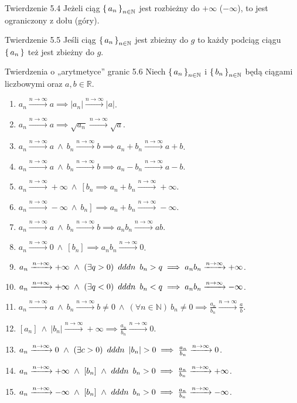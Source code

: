 \documentclass{article}
\newcommand{\hquad}{\mkern9mu}
\newcommand{\R}{\mathbb{R}}
\newcommand{\N}{\mathbb{N}}
\newcommand{\arn}{\xrightarrow{n\to\infty}}
\newcommand{\seq}[1]{\set{#1_n}_{n\in\N}}
\begin{document}
\begin{twier}{Twierdzenie 5.4}
    Jeżeli ciąg $\seq{a}$ jest rozbieżny do $+\infty$ ($-\infty$),
    to jest ograniczony z dołu (góry).
\end{twier}

\begin{twier}{Twierdzenie 5.5}
Jeśli ciąg $\seq{a}$ jest zbieżny do $g$ to każdy podciąg ciągu $\set{a_n}$ też
jest zbieżny do $g$.
\end{twier}

\begin{twier}{Twierdzenia o „arytmetyce” granic 5.6}
    Niech $\seq{a}$ i $\seq{b}$ będą ciągami liczbowymi oraz $a,b \in\R$.
    \begin{enumerate}[label=(\arabic*)]
        \item $a_n\arn a \implies |a_n|\arn|a|$.
        \item $a_n\arn a \implies \sqrt{a_n}\arn\sqrt{a}$.
        \item $a_n\arn a\ \land\  b_n\arn b \implies a_n+b_n\arn a+b$.
        \item $a_n\arn a\ \land\ b_n\arn b\implies a_n-b_n\arn a-b$.
        \item $a_n\arn+\infty\ \land\ \left[b_n\right. \implies a_n+b_n\arn +\infty$.
        \item $a_n\arn-\infty\ \land\ \left.b_n\right] \implies a_n+b_n\arn -\infty$.
        \item $a_n\arn a\ \land\ b_n\arn b\implies a_n b_n \arn ab$.
        \item $a_n\arn 0\ \land\ [b_n]\implies a_nb_n\arn 0$.
        \item $a_n\arn+\infty\ \land\ (\exists q>0)\hquad dddn\hquad b_n>q\implies a_nb_n\arn+\infty$.
        \item $a_n\arn+\infty\ \land\ (\exists q<0)\hquad dddn\hquad b_n<q\implies a_nb_n\arn-\infty$.
        \item $a_n\arn a\ \land\ b_n\arn b\neq0\ \land\ (\forall n\in\N)\ b_n\neq0\implies\frac{a_n}{b_n}\arn\frac{a}{b}$.
        \item $[a_n]\ \land\ |b_n|\arn+\infty\implies \frac{a_n}{b_n}\arn0$.
        \item $a_n\arn0\ \land\ (\exists c>0)\hquad dddn\hquad |b_n|>0 \implies \frac{a_n}{b_n}\arn0$.
        \item $a_n\arn+\infty\ \land\ [b_n]\ \land\ dddn\hquad b_n>0\implies \frac{a_n}{b_n}\arn+\infty$.
        \item $a_n\arn-\infty\ \land\ [b_n]\ \land\ dddn\hquad b_n>0\implies \frac{a_n}{b_n}\arn-\infty$.

\end{enumerate}
\end{twier}
\end{document}
